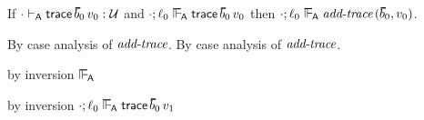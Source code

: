 \begin{lemma}\label{A-addtrace-label-preservation}
  If\/ $\snil \sWTA \eprehist{\sblist_0}{\svalue_0} : \tdyn$
  and\/ $\snil; \sowner_0 \sWLA \eprehist{\sblist_0}{\svalue_0}$
  then\/ $\snil; \sowner_0 \sWLA \faddtrace{\sblist_0}{\svalue_0}$.
\end{lemma}{
  \newcommand{\shortpf}{By case analysis of $\saddtrace$.}
\begin{lamportproof*}
  \shortpf
\mainproof
  \shortpf

    \begin{pfproof}
      \qedstep
    \end{pfproof}

    \begin{pfproof}
      \qedstep
        \begin{pfproof}
            \begin{pfproof}
              by inversion $\sWLA$
            \end{pfproof}
          \qedstep
        \end{pfproof}
    \end{pfproof}

    \begin{pfproof}
        \begin{pfproof}
          by inversion $\snil; \sowner_0 \sWLA \esuffix{\sblist_0}{\svalue_1}$
        \end{pfproof}
      \qedstep
    \end{pfproof}

\end{lamportproof*}}

